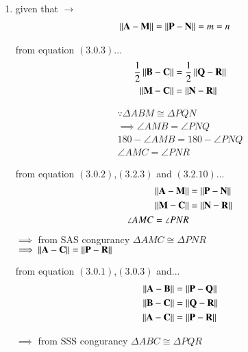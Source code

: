 \begin{enumerate}[label=\thesection.\arabic*.,ref=\thesection.\theenumi]
	
\item
given that $\to$\\
\begin{align}
\left\lVert\mathbf{A}-\mathbf{M}\right\rVert &= \left\lVert\mathbf{P}-\mathbf{N}\right\rVert = m = n
\end{align}

from equation $\left(3.0.3\right)$...
\begin{align}
\frac{1}{2}\left\lVert\mathbf{B}-\mathbf{C}\right\rVert &= \frac{1}{2}\left\lVert\mathbf{Q}-\mathbf{R}\right\rVert 
 \\
 \left\lVert\mathbf{M}-\mathbf{C}\right\rVert &= \left\lVert\mathbf{N}-\mathbf{R}\right\rVert 
\end{align}

\begin{align}
\because \Delta ABM \cong \Delta PQN 
\\
\implies \angle AMB = \angle PNQ
\\
180 - \angle AMB = 180 -  \angle PNQ
\\
\angle AMC = \angle PNR
\end{align}


from equation $\left(3.0.2\right)$,$\left(3.2.3\right)$ and $\left(3.2.10\right)$...
\begin{align}
\left\lVert\mathbf{A}-\mathbf{M}\right\rVert &= \left\lVert\mathbf{P}-\mathbf{N}\right\rVert
\\
\left\lVert\mathbf{M}-\mathbf{C}\right\rVert &= \left\lVert\mathbf{N}-\mathbf{R}\right\rVert
\\
\angle AMC = \angle PNR
\end{align}
$\implies$ from SAS congurancy $ \Delta AMC \cong \Delta PNR$
\\
%
$\implies \left\lVert\mathbf{A}-\mathbf{C}\right\rVert =\left\lVert\mathbf{P}-\mathbf{R}\right\rVert$

	from equation $\left(3.0.1\right)$,$\left(3.0.3\right)$ and...
\begin{align}
\left\lVert\mathbf{A}-\mathbf{B}\right\rVert &= \left\lVert\mathbf{P}-\mathbf{Q}\right\rVert
\\
\left\lVert\mathbf{B}-\mathbf{C}\right\rVert &= \left\lVert\mathbf{Q}-\mathbf{R}\right\rVert
\\
\left\lVert\mathbf{A}-\mathbf{C}\right\rVert &= \left\lVert\mathbf{P}-\mathbf{R}\right\rVert
\end{align}

$\implies$ from SSS congurancy $\Delta ABC \cong \Delta PQR$



\end{enumerate}
